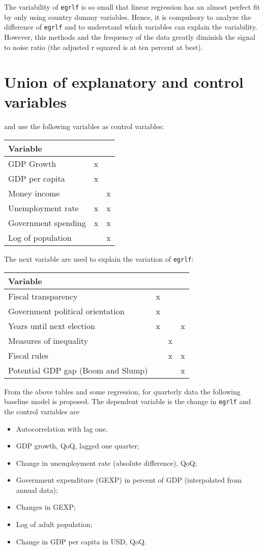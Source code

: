 \documentclass[]{article}
\providecommand{\tightlist}{%
  \setlength{\itemsep}{0pt}\setlength{\parskip}{0pt}}
\begin{document}
The variability of \texttt{egrlf} is so small that linear regression has
an almost perfect fit by only using country dummy variables. Hence, it
is compulsory to analyze the difference of \texttt{egrlf} and to
understand which variables can explain the variability. However, this
methods and the frequency of the data greatly diminish the signal to
noise ratio (the adjusted r squared is at ten percent at best).

\section{Union of explanatory and control
variables}\label{union-of-explanatory-and-control-variables}

\cite{aaskoven2015fiscal} and \cite{alt2014isn} use the following
variables as control variables:

\begin{longtable}[c]{@{}lll@{}}
\toprule
Variable & \cite{aaskoven2015fiscal} &
\cite{alesina2000redistributive}\tabularnewline
\midrule
\endhead
GDP Growth & x &\tabularnewline
GDP per capita & x &\tabularnewline
Money income & & x\tabularnewline
Unemployment rate & x & x\tabularnewline
Government spending & x & x\tabularnewline
Log of population & & x\tabularnewline
\bottomrule
\end{longtable}

The next variable are used to explain the variation of \texttt{egrlf}:

\begin{longtable}[c]{@{}llll@{}}
\toprule
Variable & \cite{aaskoven2015fiscal} & \cite{alesina2000redistributive}
& \cite{alt2014isn}\tabularnewline
\midrule
\endhead
Fiscal transparency & x & &\tabularnewline
Government political orientation & x & &\tabularnewline
Years until next election & x & & x\tabularnewline
Measures of inequality & & x &\tabularnewline
Fiscal rules & & x & x\tabularnewline
Potential GDP gap (Boom and Slump) & & & x\tabularnewline
\bottomrule
\end{longtable}

From the above tables and some regression, for quarterly data the
following baseline model is proposed. The dependent variable is the
change in \texttt{egrlf} and the control variables are

\begin{itemize}
\tightlist
\item
  Autocorrelation with lag one.
\item
  GDP growth, QoQ, lagged one quarter;
\item
  Change in unemployment rate (absolute difference), QoQ;
\item
  Government expenditure (GEXP) in percent of GDP (interpolated from
  annual data);
\item
  Changes in GEXP;
\item
  Log of adult population;
\item
  Change in GDP per capita in USD, QoQ.
\end{itemize}

\printbibliography
\end{document}
